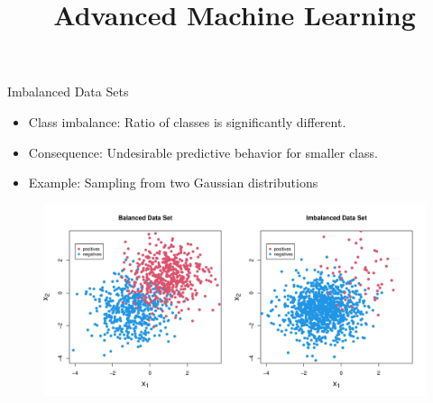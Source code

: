 \documentclass[11pt,compress,t,notes=noshow, xcolor=table]{beamer}
\title{Advanced Machine Learning}
\date{}
\begin{document}



\sloppy

\begin{vbframe}{Imbalanced Data Sets}
%		    
            \begin{itemize}
		        \item Class imbalance: Ratio of classes is significantly different. 		     
		        \item Consequence: Undesirable predictive behavior for smaller class.	    
		        \item Example: Sampling from two Gaussian distributions 
		    \end{itemize}
		   
			\begin{figure}
				\centering
				\includegraphics[width=\linewidth]{figure_man/combined_data_plots.jpg}
			\end{figure}
%
\end{vbframe}
\end{document}
